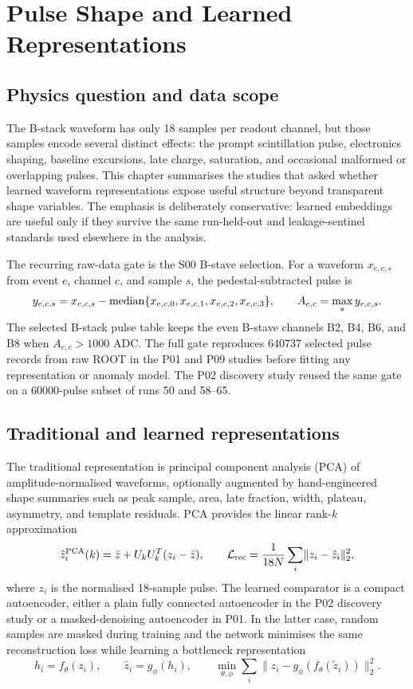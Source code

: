 \chapter{Pulse Shape and Learned Representations}

\section{Physics question and data scope}

The B-stack waveform has only 18 samples per readout channel, but those samples encode several
distinct effects: the prompt scintillation pulse, electronics shaping, baseline excursions,
late charge, saturation, and occasional malformed or overlapping pulses.  This chapter
summarises the studies that asked whether learned waveform representations expose useful
structure beyond transparent shape variables.  The emphasis is deliberately conservative:
learned embeddings are useful only if they survive the same run-held-out and leakage-sentinel
standards used elsewhere in the analysis.

The recurring raw-data gate is the S00 B-stave selection.  For a waveform $x_{e,c,s}$ from event
$e$, channel $c$, and sample $s$, the pedestal-subtracted pulse is
\begin{equation}
  y_{e,c,s} = x_{e,c,s} - {\rm median}\{x_{e,c,0},x_{e,c,1},x_{e,c,2},x_{e,c,3}\},
  \qquad A_{e,c} = \max_s y_{e,c,s}.
\end{equation}
The selected B-stack pulse table keeps the even B-stave channels B2, B4, B6, and B8 when
$A_{e,c}>1000$ ADC.  The full gate reproduces 640737 selected pulse records from raw ROOT in
the P01 and P09 studies before fitting any representation or anomaly model.  The P02 discovery
study reused the same gate on a 60000-pulse subset of runs 50 and 58--65.

\section{Traditional and learned representations}

The traditional representation is principal component analysis (PCA) of amplitude-normalised
waveforms, optionally augmented by hand-engineered shape summaries such as peak sample, area,
late fraction, width, plateau, asymmetry, and template residuals.  PCA provides the linear
rank-$k$ approximation
\begin{equation}
  \hat{z}_i^{\rm PCA}(k) = \bar{z} + U_k U_k^{T}(z_i-\bar{z}),
  \qquad
  {\cal L}_{\rm rec} = \frac{1}{18N}\sum_i \lVert z_i-\hat{z}_i\rVert_2^2 ,
\end{equation}
where $z_i$ is the normalised 18-sample pulse.  The learned comparator is a compact autoencoder,
either a plain fully connected autoencoder in the P02 discovery study or a masked-denoising
autoencoder in P01.  In the latter case, random samples are masked during training and the network
minimises the same reconstruction loss while learning a bottleneck representation
\begin{equation}
  h_i=f_\theta(z_i), \qquad \hat{z}_i=g_\phi(h_i), \qquad
  \min_{\theta,\phi} \sum_i \lVert z_i-g_\phi(f_\theta(\tilde{z}_i))\rVert_2^2 .
\end{equation}

